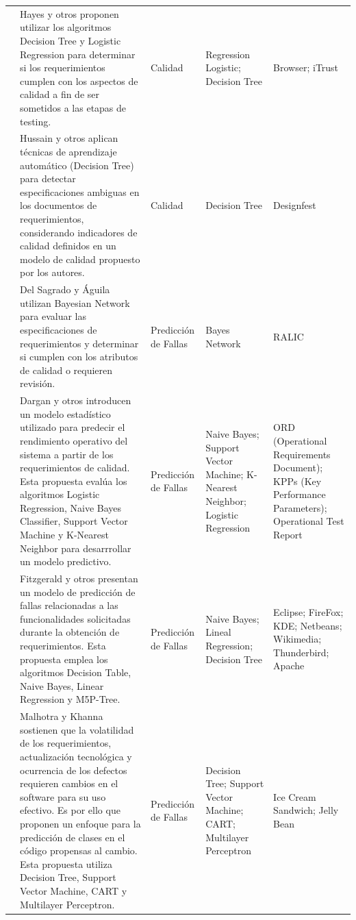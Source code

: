 \documentclass[journal]{IEEEtran}
\begin{document}
\begin{longtable}[c]{p{0.50cm}p{4.5cm}p{2.5cm}p{2.5cm}p{2.5cm}}
\cite{Hayes2015} & Hayes y otros proponen utilizar los algoritmos Decision Tree y Logistic Regression para determinar si los requerimientos cumplen con los aspectos de calidad a fin de ser sometidos a las etapas de testing. & Calidad & Regression Logistic; Decision Tree & Browser; iTrust \\ \cline{1-5}

\cite{Hussain2007} & Hussain y otros aplican técnicas de aprendizaje automático (Decision Tree) para detectar especificaciones ambiguas en los documentos de requerimientos, considerando indicadores de calidad definidos en un modelo de calidad propuesto por los autores. & Calidad & Decision Tree & Designfest \\ \cline{1-5}

\cite{del2017stability} & Del Sagrado y Águila utilizan Bayesian Network para evaluar las especificaciones de requerimientos y determinar si cumplen con los atributos de calidad o requieren revisión. & Predicción de Fallas & Bayes Network & RALIC \\ \cline{1-5}

\cite{dargan2016systems} & Dargan y otros introducen un modelo estadístico utilizado para predecir el rendimiento operativo del sistema a partir de los requerimientos de calidad.  Esta propuesta evalúa los algoritmos Logistic Regression, Naive Bayes Classifier, Support Vector Machine y K-Nearest Neighbor para desarrrollar un modelo predictivo. & Predicción de Fallas & Naive Bayes; Support Vector Machine; K- Nearest Neighbor; Logistic Regression & ORD (Operational Requirements Document); KPPs (Key Performance Parameters); Operational Test Report \\ \cline{1-5}

\cite{fitzgerald2012early} & Fitzgerald y otros presentan un modelo de predicción de fallas relacionadas a las funcionalidades solicitadas durante la obtención de requerimientos. Esta propuesta emplea los algoritmos Decision Table, Naive Bayes, Linear Regression y M5P-Tree. & Predicción de Fallas & Naive Bayes; Lineal Regression; Decision Tree  & Eclipse; FireFox; KDE; Netbeans; Wikimedia; Thunderbird; Apache \\ \cline{1-5}

\cite{malhotra2017exploratory} & Malhotra y Khanna sostienen que la volatilidad de los requerimientos, actualización tecnológica y ocurrencia de los defectos requieren cambios en el software para su uso efectivo. Es por ello que proponen un enfoque para la predicción de clases en el código propensas al cambio. Esta propuesta utiliza Decision Tree, Support Vector Machine, CART y Multilayer Perceptron. & Predicción de Fallas  & Decision Tree; Support Vector Machine; CART; Multilayer Perceptron & Ice Cream Sandwich; Jelly Bean \\ \cline{1-5}


\end{longtable}
\end{document}

